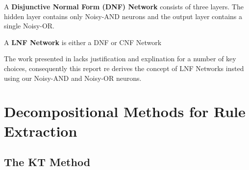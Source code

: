 \begin{definition}
A \textbf{Disjunctive Normal Form (DNF) Network} consists of three layers. The hidden layer contains only Noisy-AND neurons and the output layer contains a single Noisy-OR.
\end{definition}

\begin{definition}
A \textbf{LNF Network} is either a DNF or CNF Network
\end{definition}

The work presented in \cite{herrmann1996backpropagation} lacks justification and explination for a number of key choices, consequently this report re derives the concept of LNF Networks insted using our Noisy-AND and Noisy-OR neurons.


\section{Decompositional Methods for Rule Extraction}
\subsection{The KT Method}
